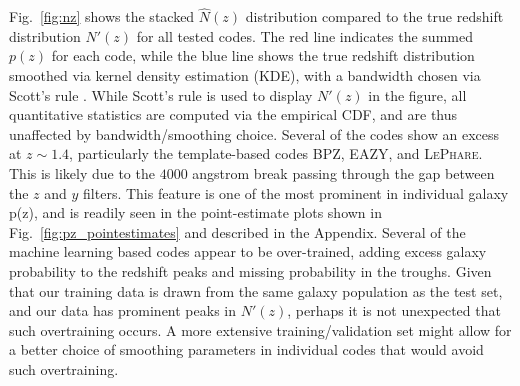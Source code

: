\documentclass[usenatbib]{mn2e}
\newcommand{\aim}[1]{\textcolor{green}{#1}}%
\begin{document}
Fig.~\ref{fig:nz} shows the stacked $\hat{N}(z)$ distribution compared to the true redshift distribution $N'(z)$ for all tested codes.  The red line indicates the summed $p(z)$ for each code, while the blue line shows the true redshift distribution smoothed via kernel density estimation (KDE), with a bandwidth chosen via Scott's rule \citep{Scott:1992}.  While Scott's rule is used to display $N'(z)$ in the figure, all quantitative statistics are computed via the empirical CDF, and are thus unaffected by bandwidth/smoothing choice.  
Several of the codes show an excess at $z \sim 1.4$, particularly the template-based codes \textsc{BPZ}, \textsc{EAZY}, and \textsc{LePhare}.  
This is likely due to the $4000$ angstrom break passing through the gap between the $z$ and $y$ filters.  
This feature is one of the most prominent in individual galaxy p(z), and is readily seen in the point-estimate plots shown in Fig.~\ref{fig:pz_pointestimates} and described in the Appendix.  
Several of the machine learning based codes appear to be over-trained, adding excess galaxy probability to the redshift peaks and missing probability in the troughs.  
Given that our training data is drawn from the same galaxy population as the test set, and our data has prominent peaks in $N'(z)$, perhaps it is not unexpected that such overtraining occurs. 
A more extensive training/validation set might allow for a better choice of smoothing parameters in individual codes that would avoid such overtraining.

\end{document}
